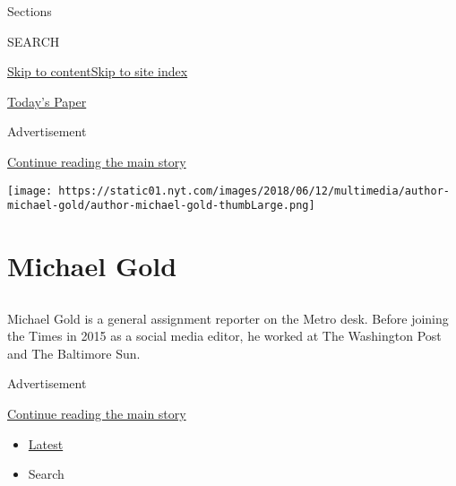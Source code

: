 Sections

SEARCH

\protect\hyperlink{site-content}{Skip to
content}\protect\hyperlink{site-index}{Skip to site index}

\href{https://myaccount.nytimes.com/auth/login?response_type=cookie\&client_id=vi}{}

\href{https://www.nytimes.com/section/todayspaper}{Today's Paper}

Advertisement

\protect\hyperlink{after-top}{Continue reading the main story}

\texttt{[image: https://static01.nyt.com/images/2018/06/12/multimedia/author-michael-gold/author-michael-gold-thumbLarge.png]}

\hypertarget{michael-gold}{%
\section{Michael Gold}\label{michael-gold}}

\subsection{}

Michael Gold is a general assignment reporter on the Metro desk. Before
joining the Times in 2015 as a social media editor, he worked at The
Washington Post and The Baltimore Sun.

Advertisement

\protect\hyperlink{after-mid1}{Continue reading the main story}

\begin{itemize}
\tightlist
\item
  \protect\hyperlink{stream-panel}{Latest}
\item
  Search
\end{itemize}

